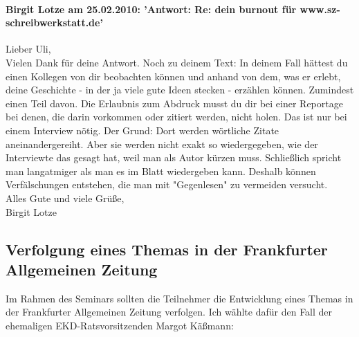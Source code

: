 \documentclass[a4paper,12pt,oneside]{scrbook}
\begin{document}
\paragraph{Birgit Lotze am 25.02.2010: 'Antwort: Re: dein burnout für www.sz-schreibwerkstatt.de'}
Lieber Uli,
\\
Vielen Dank für deine Antwort. Noch zu deinem Text: In deinem Fall hättest du einen Kollegen von dir beobachten können und anhand von dem, was er erlebt, deine Geschichte - in der ja viele gute Ideen stecken - erzählen können. Zumindest einen Teil davon. Die Erlaubnis zum Abdruck musst du dir bei einer Reportage bei denen, die darin vorkommen oder zitiert werden, nicht holen. Das ist nur bei einem Interview nötig. Der Grund:  Dort werden wörtliche Zitate aneinandergereiht. Aber sie werden nicht exakt so wiedergegeben, wie der Interviewte das gesagt hat, weil man als Autor kürzen muss. Schließlich spricht man langatmiger als man es im Blatt wiedergeben kann. Deshalb können Verfälschungen entstehen, die man mit "Gegenlesen" zu vermeiden versucht.
\\
Alles Gute und viele Grüße,
\\
Birgit Lotze

\subsection{Verfolgung eines Themas in der Frankfurter Allgemeinen Zeitung}
Im Rahmen des Seminars sollten die Teilnehmer die Entwicklung eines Themas in der Frankfurter Allgemeinen Zeitung verfolgen.
Ich wählte dafür den Fall der ehemaligen EKD-Ratsvorsitzenden Margot Käßmann:
\end{document}
